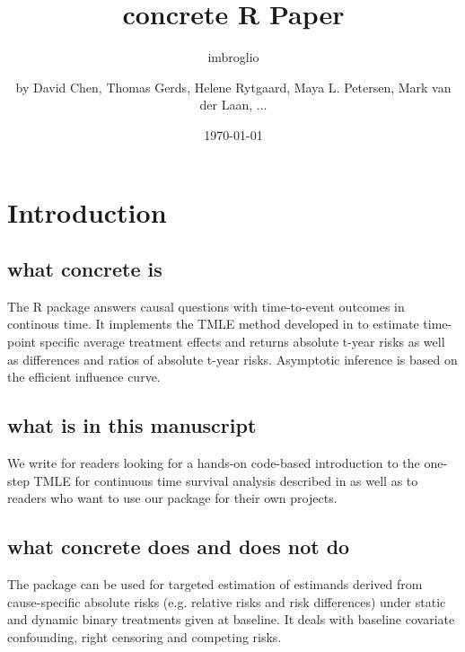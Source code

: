 \documentclass{report}
\author{imbroglio}
\date{\today}
\title{}
\newcommand{\1}{\ensuremath{\mathbf{1}}}
\begin{document}
\title{concrete R Paper}
\subtitle{}
\author{by David Chen, Thomas Gerds, Helene Rytgaard, Maya L. Petersen, Mark van der Laan, ...}

\maketitle


\section{Introduction}
\label{intro}
\subsection{what concrete is}
\label{sec:orgdc6e3fc}

The R package  answers causal questions with time-to-event outcomes in continous time. It implements the TMLE method developed in \cite{rytgaard2021one} to estimate time-point specific average treatment effects and returns absolute t-year risks as well as differences and ratios of absolute t-year risks. Asymptotic inference is based on the efficient influence curve.

\subsection{what is in this manuscript}
\label{sec:org2935356}

We write for readers looking for a hands-on code-based introduction to the one-step TMLE for
continuous time survival analysis described in \cite{rytgaard2021one} as well as to readers
who want to use our package for their own projects.

\subsection{what concrete does and does not do}
\label{sec:org2e03d30}
The package can be used for targeted estimation of estimands derived from cause-specific absolute risks (e.g. relative risks and risk differences) under static and dynamic binary treatments given at baseline. It deals with baseline covariate confounding, right censoring and competing risks.
\end{document}
